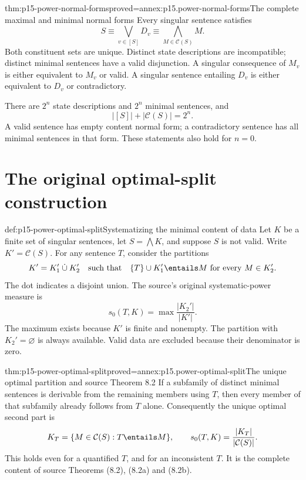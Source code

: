 \begin{hbtheorem}{thm:p15-power-normal-forms}{proved=annex:p15.power-normal-forms}{The complete maximal and minimal normal forms}
Every singular sentence satisfies
\[
               S\equiv\bigvee_{v\in[S]}D_v
                    \equiv\bigwedge_{M\in\mathcal C(S)}M .
\]
Both constituent sets are unique.
Distinct state descriptions are incompatible;
distinct minimal sentences have a valid disjunction.
A singular consequence of \(M_v\) is either
equivalent to \(M_v\) or valid. A singular
sentence entailing \(D_v\) is either equivalent
to \(D_v\) or contradictory.

There are \(2^n\) state descriptions and
\(2^n\) minimal sentences, and
\[
                   |[S]|+|\mathcal C(S)|=2^n .
\]
A valid sentence has empty content normal form;
a contradictory sentence has all minimal
sentences in that form. These statements
also hold for \(n=0\).
\end{hbtheorem}

\section{The original optimal-split construction}
\label{sec:p15-power-optimal-split}

\begin{hbdefinition}{def:p15-power-optimal-split}{Systematizing the minimal content of data}
Let \(K\) be a finite set of singular sentences,
let \(S=\bigwedge K\), and suppose \(S\) is
not valid. Write \(K'=\mathcal C(S)\).
For any sentence \(T\), consider the partitions
\[
              K'=K_1'\mathbin{\dot\cup}K_2'
       \quad\hbox{such that}\quad \{T\}\cup K_1'\entails M
                        \ \text{for every }M\in K_2'.
\]
The dot indicates a disjoint union. The source's
original systematic-power measure is
\[
 s_0(T,K)=\max\frac{|K_2'|}{|K'|}.
\]
The maximum exists because \(K'\) is finite and
nonempty. The partition with \(K_2'=\varnothing\)
is always available. Valid data are excluded
because their denominator is zero.
\end{hbdefinition}

\begin{hbtheorem}{thm:p15-power-optimal-split}{proved=annex:p15.power-optimal-split}{The unique optimal partition and source Theorem 8.2}
If a subfamily of distinct minimal sentences
is derivable from the remaining members
using \(T\), then every member of that
subfamily already follows from \(T\) alone.
Consequently the unique optimal second
part is
\[
 K_T=\{M\in\mathcal C(S):T\entails M\},
       \qquad s_0(T,K)=\frac{|K_T|}{|\mathcal C(S)|}.
\]
This holds even for a quantified \(T\),
and for an inconsistent \(T\).
It is the complete content of source
Theorems (8.2), (8.2a) and (8.2b).
\end{hbtheorem}

